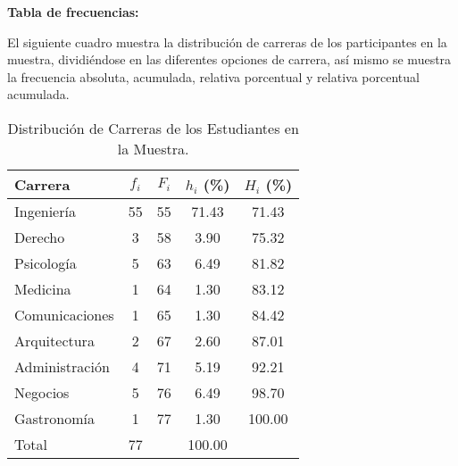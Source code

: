 \textbf{Tabla de frecuencias:}

El siguiente cuadro muestra la distribución de carreras de los participantes en la muestra, dividiéndose en las diferentes opciones de carrera, así mismo se muestra la frecuencia absoluta, acumulada, relativa porcentual y relativa porcentual acumulada.



\begin{table}[H]
  \centering
  \begin{tabular}{l @{\hskip 0.6cm} c @{\hskip 0.6cm} c @{\hskip 0.6cm} c @{\hskip 0.6cm} c}
    \hline
    \textbf{Carrera} & \textbf{$f_i$} & \textbf{$F_i$} & \textbf{$h_i$ (\%)} & \textbf{$H_i$ (\%)} \\ \hline
    Ingeniería       & 55             & 55             & 71.43               & 71.43               \\ \hline
    Derecho          & 3              & 58             & 3.90                & 75.32               \\ \hline
    Psicología       & 5              & 63             & 6.49                & 81.82               \\ \hline
    Medicina         & 1              & 64             & 1.30                & 83.12               \\ \hline
    Comunicaciones   & 1              & 65             & 1.30                & 84.42               \\ \hline
    Arquitectura     & 2              & 67             & 2.60                & 87.01               \\ \hline
    Administración   & 4              & 71             & 5.19                & 92.21               \\ \hline
    Negocios         & 5              & 76             & 6.49                & 98.70               \\ \hline
    Gastronomía      & 1              & 77             & 1.30                & 100.00              \\ \hline
    Total            & 77             &                & 100.00              &                     \\ \hline
  \end{tabular}
  \caption{Distribución de Carreras de los Estudiantes en la Muestra.}
  \label{tab:carreras-frecuencias}
\end{table}

